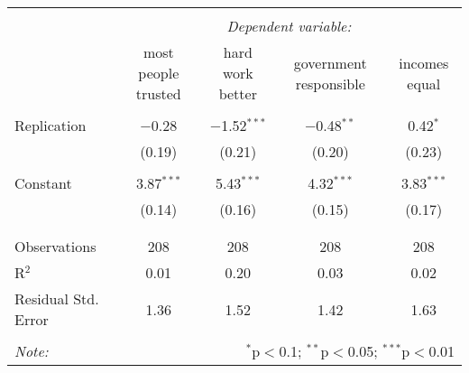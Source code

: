 \documentclass[11pt,]{article}
\begin{document}
\begin{table}[!htbp] \centering 
  \caption{} 
  \label{} 
\begin{tabular}{@{\extracolsep{5pt}}lcccc} 
\\[-1.8ex]\hline 
\hline \\[-1.8ex] 
 & \multicolumn{4}{c}{\textit{Dependent variable:}} \\ 
\cline{2-5} 
 & most people trusted & hard work better & government responsible & incomes equal \\ 
\hline \\[-1.8ex] 
 Replication & $-$0.28 & $-$1.52$^{***}$ & $-$0.48$^{**}$ & 0.42$^{*}$ \\ 
  & (0.19) & (0.21) & (0.20) & (0.23) \\ 
  & & & & \\ 
 Constant & 3.87$^{***}$ & 5.43$^{***}$ & 4.32$^{***}$ & 3.83$^{***}$ \\ 
  & (0.14) & (0.16) & (0.15) & (0.17) \\ 
  & & & & \\ 
\hline \\[-1.8ex] 
Observations & 208 & 208 & 208 & 208 \\ 
R$^{2}$ & 0.01 & 0.20 & 0.03 & 0.02 \\ 
Residual Std. Error & 1.36 & 1.52 & 1.42 & 1.63 \\ 
\hline 
\hline \\[-1.8ex] 
\textit{Note:}  & \multicolumn{4}{r}{$^{*}$p$<$0.1; $^{**}$p$<$0.05; $^{***}$p$<$0.01} \\ 
\end{tabular} 
\end{table}
\end{document}
